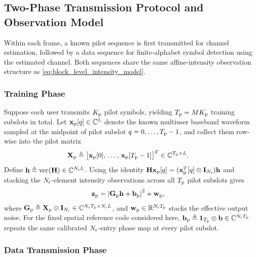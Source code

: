 \documentclass[journal]{IEEEtran}
\begin{document}
\subsection{Two-Phase Transmission Protocol and Observation Model}

Within each frame, a known pilot sequence is first transmitted for channel estimation, followed by a data sequence for finite-alphabet symbol detection using the estimated channel. Both sequences share the same affine-intensity observation structure as \eqref{eq:block_level_intensity_model}.

\subsubsection{Training Phase}
Suppose each user transmits $K_{\rm p}$ pilot symbols, yielding $T_{\rm p} = M K_{\rm p}$ training subslots in total. Let $\mathbf{x}_{\rm p}[q] \in \mathbb{C}^L$ denote the known multiuser baseband waveform sampled at the midpoint of pilot subslot $q = 0,\ldots,T_{\rm p}-1$, and collect them row-wise into the pilot matrix
\begin{equation}
\mathbf{X}_{\rm p} \triangleq \big[\mathbf{x}_{\rm p}[0],\,\ldots,\,\mathbf{x}_{\rm p}[T_{\rm p}-1]\big]^T \in \mathbb{C}^{T_{\rm p} \times L}.
\end{equation}
Define $\mathbf{h} \triangleq \operatorname{vec}(\mathbf{H}) \in \mathbb{C}^{N_{\rm r} L}$. Using the identity $\mathbf{H}\mathbf{x}_{\rm p}[q] = (\mathbf{x}_{\rm p}^T[q] \otimes \mathbf{I}_{N_{\rm r}})\mathbf{h}$ and stacking the $N_{\rm r}$-element intensity observations across all $T_{\rm p}$ pilot subslots gives
\begin{equation}
\mathbf{z}_{\rm p}
=
\left|
\mathbf{G}_{\rm p}\mathbf{h}
+
\mathbf{b}_{\rm p}
\right|^2
+
\mathbf{w}_{\rm p},
\label{eq:block_pilot_phase_model}
\end{equation}
where $\mathbf{G}_{\rm p} \triangleq \mathbf{X}_{\rm p} \otimes \mathbf{I}_{N_{\rm r}} \in \mathbb{C}^{N_{\rm r} T_{\rm p} \times N_{\rm r} L}$, and $\mathbf{w}_{\rm p} \in \mathbb{R}^{N_{\rm r} T_{\rm p}}$ stacks the effective output noise. For the fixed spatial reference code considered here, $\mathbf{b}_{\rm p} \triangleq \mathbf{1}_{T_{\rm p}} \otimes \mathbf{b} \in \mathbb{C}^{N_{\rm r} T_{\rm p}}$ repeats the same calibrated $N_{\rm r}$-entry phase map at every pilot subslot.

\subsubsection{Data Transmission Phase}
\end{document}
